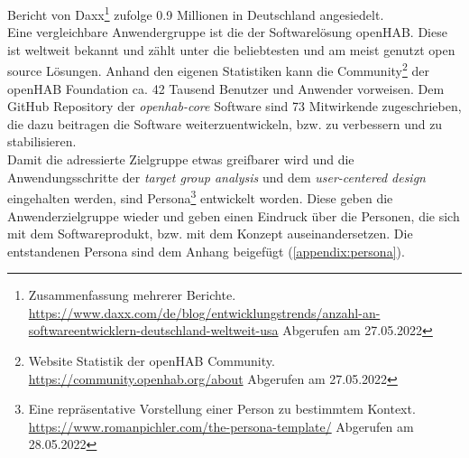         Bericht von Daxx\footnote{Zusammenfassung mehrerer Berichte. \url{https://www.daxx.com/de/blog/entwicklungstrends/anzahl-an-softwareentwicklern-deutschland-weltweit-usa} Abgerufen am 27.05.2022}
        zufolge 0.9 Millionen in Deutschland angesiedelt. 
        \\
        \linebreak
        Eine vergleichbare Anwendergruppe ist die der Softwarelösung openHAB. Diese ist weltweit bekannt und zählt unter die 
        beliebtesten und am meist genutzt open source Lösungen. Anhand den eigenen Statistiken kann die Community\footnote{Website Statistik der openHAB Community. \url{https://community.openhab.org/about} Abgerufen am 27.05.2022} 
        der openHAB Foundation ca. 42 Tausend Benutzer und Anwender vorweisen. Dem GitHub Repository der \textit{openhab-core} 
        Software sind 73 Mitwirkende zugeschrieben, die dazu beitragen die Software weiterzuentwickeln, bzw. zu verbessern und zu 
        stabilisieren.
    \\
    \linebreak 
    Damit die adressierte Zielgruppe etwas greifbarer wird und die Anwendungsschritte der \textit{target group analysis} und 
    dem \textit{user-centered design} eingehalten werden, sind Persona\footnote{Eine repräsentative Vorstellung einer Person zu bestimmtem Kontext. \url{https://www.romanpichler.com/the-persona-template/} Abgerufen am 28.05.2022} 
    entwickelt worden. Diese geben die Anwenderzielgruppe wieder und geben einen Eindruck über die Personen, die sich mit dem 
    Softwareprodukt, bzw. mit dem Konzept auseinandersetzen. Die entstandenen Persona sind dem Anhang beigefügt 
    (\ref{appendix:persona}). %

